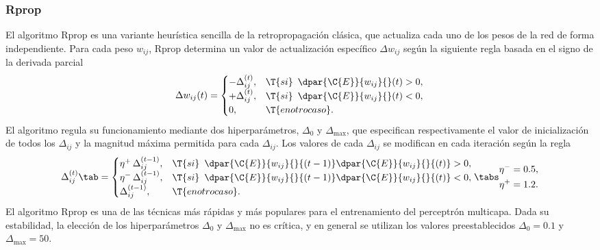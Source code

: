 %
\subsubsection{Rprop}
%
El algoritmo Rprop \cite{rprop} es una variante
heurística sencilla de la retropropagación clásica, que actualiza cada uno de
los pesos de la red de forma independiente.
Para cada peso $w_{ij}$, Rprop determina un valor de actualización
específico $\Delta{}w_{ij}$ según la siguiente regla basada en el
signo de la derivada parcial
%
\begin{align}
  \Delta{}w_{ij}(t) =
  \begin{cases}
    -\Delta_{ij}^{(t)}, & \T{si}\,\,\,\dpar{\C{E}}{w_{ij}}{}(t) > 0, \\
    +\Delta_{ij}^{(t)}, & \T{si}\,\,\,\dpar{\C{E}}{w_{ij}}{}(t) < 0, \\
    0, & \T{en otro caso}.
  \end{cases}
\end{align}
%
El algoritmo regula su funcionamiento mediante dos hiperparámetros,
$\Delta_0$ y $\Delta_{\max}$, que especifican respectivamente el valor
de inicialización de todos los $\Delta_{ij}$ y la magnitud máxima
permitida para cada $\Delta_{ij}$.  Los valores de cada $\Delta_{ij}$
se modifican en cada iteración según la regla
%
\begin{align}
  \Delta{}_{ij}^{(t)} \tab =
  \begin{cases}
    \eta^+\,\Delta_{ij}^{(t-1)}, & \T{si}\,\,\,\dpar{\C{E}}{w_{ij}}{} {(t-1)}
      \dpar{\C{E}}{w_{ij}}{} {(t)} > 0, \\
    \eta^-\,\Delta_{ij}^{(t-1)}, & \T{si}\,\,\,\dpar{\C{E}}{w_{ij}}{} {(t-1)}
      \dpar{\C{E}}{w_{ij}}{} {(t)} < 0, \\
    \Delta_{ij}^{(t-1)}, & \T{en otro caso}.
  \end{cases}
  \tabs
  \begin{split}
    \eta^-=0.5, \\
    \eta^+=1.2.
  \end{split}
\end{align}
%
El algoritmo Rprop es una de las técnicas más rápidas
y más populares para el entrenamiento del perceptrón multicapa.
Dada su estabilidad, la elección de los hiperparámetros
$\Delta_{0}$ y $\Delta_{\max}$ no es crítica, y en general
se utilizan los valores preestablecidos $\Delta_{0}=0.1$ y
$\Delta_{\max}=50$.
